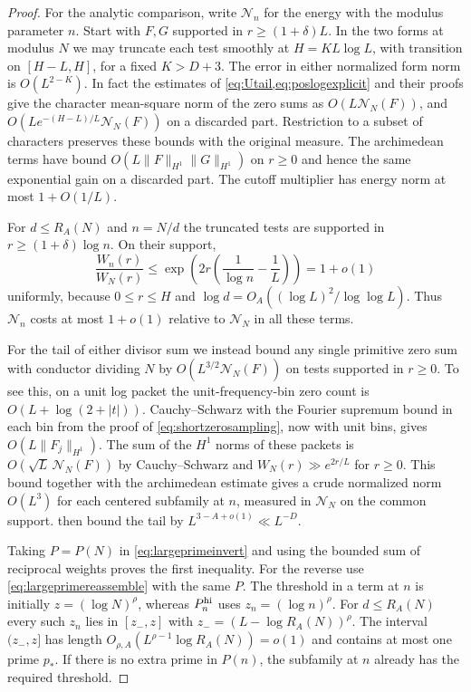 \documentclass[11pt,a4paper]{article}
\numberwithin{equation}{section}
\newcommand{\NN}{\mathcal N_N}
\begin{document}
\begin{proof}
For the analytic comparison, write $\mathcal N_n$ for the energy
with the modulus parameter $n$. Start with $F,G$ supported in
$r\ge(1+\delta)L$. In the two forms at modulus $N$ we may
truncate each test smoothly at $H=K L\log L$, with transition
on $[H-L,H]$, for a fixed $K>D+3$. The error in either
normalized form norm is $O(L^{2-K})$. In fact the estimates
of \cref{eq:Utail,eq:poslogexplicit} and their proofs give
the character mean-square norm of the zero sums as
$O(L\NN(F))$, and $O(Le^{-(H-L)/L}\NN(F))$
on a discarded part. Restriction to a subset of characters
preserves these bounds with the original measure.
The archimedean terms have bound
$O(L\|F\|_{H^1}\|G\|_{H^1})$ on $r\ge0$ and hence the same
exponential gain on a discarded part. The cutoff multiplier
has energy norm at most $1+O(1/L)$.

For $d\le R_A(N)$ and $n=N/d$ the truncated tests are
supported in $r\ge(1+\delta)\log n$. On their support,
\[
 \frac{W_n(r)}{W_N(r)}
       \le\exp\!\left(2r\left(\frac1{\log n}-\frac1L\right)\right)
       =1+o(1)
\]
uniformly, because $0\le r\le H$ and $\log d=O_A((\log L)^2/
\log\log L)$. Thus $\mathcal N_n$ costs at most $1+o(1)$
relative to $\NN$ in all these terms.

For the tail of either divisor sum we instead bound any
single primitive zero sum with conductor dividing $N$ by
$O(L^{3/2}\NN(F))$ on tests supported in $r\ge0$.
To see this, on a unit log packet the unit-frequency-bin
zero count is $O(L+\log(2+|t|))$. Cauchy--Schwarz with
the Fourier supremum bound in each bin from the proof of
\cref{eq:shortzerosampling}, now with unit bins, gives
$O(L\|F_j\|_{H^1})$. The sum of the $H^1$ norms of
these packets is $O(\sqrt L\,\NN(F))$ by Cauchy--Schwarz
and $W_N(r)\gg e^{2r/L}$ for $r\ge0$.
This bound together with the archimedean estimate gives a
crude normalized norm $O(L^3)$ for each centered subfamily
at $n$, measured in $\NN$ on the common support.
then bound the tail by $L^{3-A+o(1)}\ll L^{-D}$.

Taking $P=P(N)$ in \cref{eq:largeprimeinvert} and using the
bounded sum of reciprocal weights proves the first inequality.
For the reverse use \cref{eq:largeprimereassemble} with the
same $P$. The threshold in a term at $n$ is initially
$z=(\log N)^\rho$, whereas $P_n^{\rm hi}$ uses
$z_n=(\log n)^\rho$. For $d\le R_A(N)$ every such $z_n$
lies in $[z_-,z]$ with
$z_-=(L-\log R_A(N))^\rho$. The interval $(z_-,z]$ has
length $O_{\rho,A}(L^{\rho-1}\log R_A(N))=o(1)$
and contains at most one prime $p_*$. If there is no
extra prime in $P(n)$, the subfamily at $n$ already has
the required threshold.


\end{proof}
\end{document}
